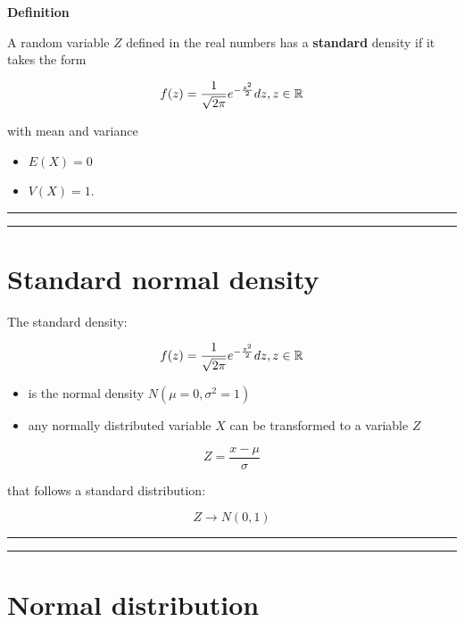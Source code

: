 \documentclass[
]{book}
\begin{document}
\textbf{Definition}

A random variable \(Z\) defined in the real numbers has a \textbf{standard} density if it takes the form

\[f(z)=\frac{1}{\sqrt{2\pi}}e^{-\frac{z^2}{2}} dz,z \in {\Bbb R}\]

with mean and variance

\begin{itemize}
\item
  \(E (X) = 0\)
\item
  \(V (X) =1\).
\end{itemize}

\begin{center}\rule{0.5\linewidth}{0.5pt}\end{center}

\begin{center}\rule{0.5\linewidth}{0.5pt}\end{center}

\hypertarget{standard-normal-density-2}{%
\section{Standard normal density}\label{standard-normal-density-2}}

The standard density:

\[f(z)=\frac{1}{\sqrt{2\pi}}e^{-\frac{z^2}{2}} dz,z \in {\Bbb R}\]

\begin{itemize}
\item
  is the normal density \(N(\mu=0,\sigma^2=1)\)
\item
  any normally distributed variable \(X\) can be transformed to a variable \(Z\)
\end{itemize}

\[Z=\frac{x-\mu}{\sigma}\]

that follows a standard distribution:

\[Z \rightarrow N(0,1)\]

\begin{center}\rule{0.5\linewidth}{0.5pt}\end{center}

\begin{center}\rule{0.5\linewidth}{0.5pt}\end{center}

\hypertarget{normal-distribution-6}{%
\section{Normal distribution}\label{normal-distribution-6}}
\end{document}
